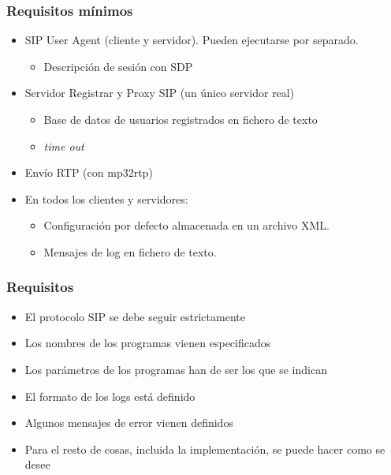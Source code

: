 \documentclass{beamer}
\begin{document}
\begin{frame}
\frametitle{Requisitos mínimos}

\begin{itemize}
\item SIP User Agent (cliente y servidor). Pueden ejecutarse por separado.
\begin{itemize}
  \item Descripción de sesión con SDP
\end{itemize}
\item Servidor Registrar y Proxy SIP (un único servidor real)
\begin{itemize}
  \item Base de datos de usuarios registrados en fichero de texto
  \item \emph{time out}
\end{itemize}
\item Envío RTP (con mp32rtp)
\item En todos los clientes y servidores:
\begin{itemize}
  \item Configuración por defecto almacenada en un archivo XML.
  \item Mensajes de log en fichero de texto.
\end{itemize}

\end{itemize}

\end{frame}



\begin{frame}
\frametitle{Requisitos}

\begin{itemize}
  \item El protocolo SIP se debe seguir estrictamente
  \item Los nombres de los programas vienen especificados
  \item Los parámetros de los programas han de ser los que se indican
  \item El formato de los logs está definido
  \item Algunos mensajes de error vienen definidos
  \item Para el resto de cosas, incluida la implementación, se puede hacer 
como se desee
\end{itemize}


\end{frame}
\end{document}
